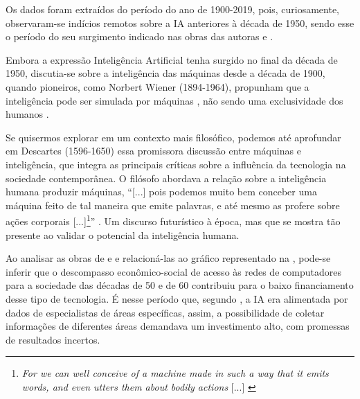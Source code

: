 \documentclass[portuguese]{textolivre}
\begin{document}
Os dados foram extraídos do período do ano de 1900-2019, pois, curiosamente, observaram-se indícios remotos sobre a IA anteriores à década de 1950, sendo esse o período do seu surgimento indicado nas obras das autoras \textcite{2022kaufman} e \textcite{santaella2023inteligencia}.

Embora a expressão Inteligência Artificial tenha surgido no final da década de 1950, discutia-se sobre a inteligência das máquinas desde a década de 1900, quando pioneiros, como Norbert Wiener (1894-1964), propunham que a inteligência pode ser simulada por máquinas \cite{ribas2020}, não sendo uma exclusividade dos humanos \cite{santaella2023inteligencia}.

Se quisermos explorar em um contexto mais filosófico, podemos até aprofundar em Descartes (1596-1650) essa promissora discussão entre máquinas e inteligência, que integra as principais críticas sobre a influência da tecnologia na sociedade contemporânea. O filósofo abordava a relação sobre a inteligência humana produzir máquinas, “[...] pois podemos muito bem conceber uma máquina feito de tal maneira que emite palavras, e até mesmo as profere sobre ações corporais [...]\footnote{\emph{For we can well conceive of a machine made in such a way that it emits words, and even utters them about bodily actions} [...] \cite[p. 57]{mclean2006}}” \cite[p. 57, tradução nossa]{mclean2006}. Um discurso futurístico à época, mas que se mostra tão presente ao validar o potencial da inteligência humana.

Ao analisar as obras de \textcite{2022kaufman} e \textcite{santaella2023inteligencia} e relacioná-las ao gráfico representado na , pode-se inferir que o descompasso econômico-social de acesso às redes de computadores para a sociedade das décadas de 50 e de 60 contribuiu para o baixo financiamento desse tipo de tecnologia. É nesse período que, segundo \textcite{santaella2023inteligencia}, a IA era alimentada por dados de especialistas de áreas específicas, assim, a possibilidade de coletar informações de diferentes áreas demandava um investimento alto, com promessas de resultados incertos. 
\end{document}
